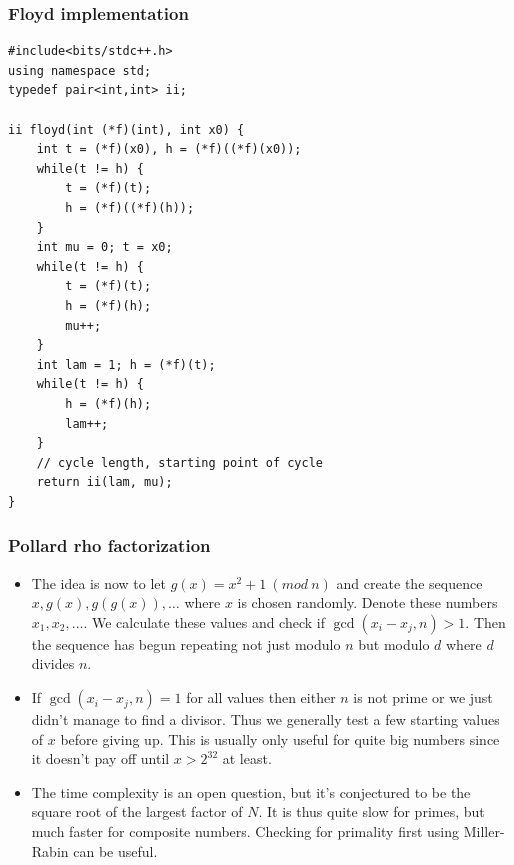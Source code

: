\documentclass{beamer}
\begin{document}
\begin{frame}
\frametitle{Floyd implementation}

\begin{tiny}
\begin{verbatim}
#include<bits/stdc++.h>
using namespace std;
typedef pair<int,int> ii;

ii floyd(int (*f)(int), int x0) {
    int t = (*f)(x0), h = (*f)((*f)(x0));
    while(t != h) {
        t = (*f)(t); 
        h = (*f)((*f)(h));
    }
    int mu = 0; t = x0;
    while(t != h) {
        t = (*f)(t);
        h = (*f)(h);
        mu++;
    }
    int lam = 1; h = (*f)(t);
    while(t != h) {
        h = (*f)(h);
        lam++;
    }
    // cycle length, starting point of cycle
    return ii(lam, mu);
}

\end{verbatim}
\end{tiny}

\end{frame}

\begin{frame}[plain]
\frametitle{Pollard rho factorization}

\begin{itemize}

\item The idea is now to let $g(x) = x^2 + 1 \ (mod \ n)$ and create the sequence $x, g(x), g(g(x)), \dots$ where $x$ is chosen randomly. Denote these numbers $x_1, x_2, \dots$. We calculate these values and check if $\operatorname{gcd}(x_i - x_j, n) > 1$. Then the sequence has begun repeating not just modulo $n$ but modulo $d$ where $d$ divides $n$.

\item If $\operatorname{gcd}(x_i - x_j, n) = 1$ for all values then either $n$ is not prime or we just didn't manage to find a divisor. Thus we generally test a few starting values of $x$ before giving up. This is usually only useful for quite big numbers since it doesn't pay off until $x > 2^{32}$ at least.

\item The time complexity is an open question, but it's conjectured to be the square root of the largest factor of $N$. It is thus quite slow for primes, but much faster for composite numbers. Checking for primality first using Miller-Rabin can be useful.

\end{itemize}

\end{frame}
\end{document}
